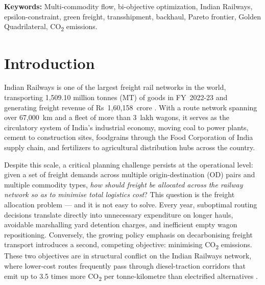 \documentclass[11pt, a4paper]{article}
\numberwithin{equation}{section}
\numberwithin{figure}{section}
\numberwithin{table}{section}
\begin{document}
\vspace{1cm}

\noindent\textbf{Keywords:} Multi-commodity flow, bi-objective optimization, Indian Railways, 
epsilon-constraint, green freight, transshipment, backhaul, Pareto frontier, 
Golden Quadrilateral, CO\textsubscript{2} emissions.

\newpage
\tableofcontents

\newpage
\listoffigures
\listoftables

\newpage
{}
\setcounter{page}{1}

\section{Introduction}
\label{sec:intro}

Indian Railways is one of the largest freight rail networks in the world, transporting
1,509.10 million tonnes (MT) of goods in FY~2022-23 and generating freight revenue of
Rs~1,60,158~crore \cite{iryearbook2023}. With a route network spanning over 67,000~km and
a fleet of more than 3~lakh wagons, it serves as the circulatory system of India's
industrial economy, moving coal to power plants, cement to construction sites,
foodgrains through the Food Corporation of India supply chain, and fertilizers to
agricultural distribution hubs across the country.

Despite this scale, a critical planning challenge persists at the operational level: given
a set of freight demands across multiple origin-destination (OD) pairs and multiple
commodity types, \textit{how should freight be allocated across the railway network so as
to minimise total logistics cost}? This question is the freight allocation problem — and it is not easy to solve. Every year, suboptimal routing decisions translate directly into
unnecessary expenditure on longer hauls, avoidable marshalling yard detention charges,
and inefficient empty wagon repositioning. Conversely, the growing policy emphasis on
decarbonising freight transport introduces a second, competing objective: minimising
CO\textsubscript{2} emissions. These two objectives are in structural conflict on the
Indian Railways network, where lower-cost routes frequently pass through diesel-traction
corridors that emit up to 3.5 times more CO\textsubscript{2} per tonne-kilometre than
electrified alternatives \cite{sfcindia2025}.
\end{document}
